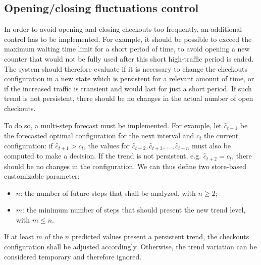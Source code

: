 \subsection{Opening/closing fluctuations control}
\label{subsec:opening_closing_fluctuations_control}

In order to avoid opening and closing checkouts too frequently, an additional control has to be implemented. For example, it should be possible to exceed the maximum waiting time limit for a short period of time, to avoid opening a new counter that would not be fully used after this short high-traffic period is ended. The system should therefore evaluate if it is necessary to change the checkouts configuration in a new state which is persistent for a relevant amount of time, or if the increased traffic is transient and would last for just a short period. If such trend is not persistent, there should be no changes in the actual number of open checkouts.

To do so, a multi-step forecast must be implemented. For example, let \( \hat{c}_{t+1} \) be the forecasted optimal configuration for the next interval and \( c_t \) the current configuration: if \( \hat{c}_{t+1} > c_t \), the values for \( \hat{c}_{t+2}, \hat{c}_{t+3}, ..., \hat{c}_{t+n} \) must also be computed to make a decision. If the trend is not persistent, e.g. \( \hat{c}_{t+2} = c_t \), there should be no changes in the configuration. We can thus define two store-based customizable parameter:
\begin{itemize}
  \item \( n \): the number of future steps that shall be analyzed, with \( n \ge 2 \);
  \item \( m \): the minimum number of steps that should present the new trend level, with \( m \le n \).
\end{itemize}

If at least \( m \) of the \( n \) predicted values present a persistent trend, the checkouts configuration shall be adjusted accordingly. Otherwise, the trend variation can be considered temporary and therefore ignored.

\clearpage